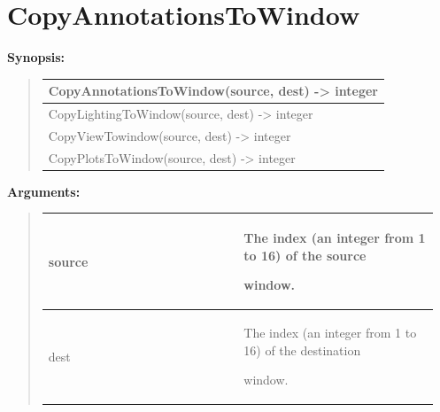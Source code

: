 \documentclass[letterpaper,10pt,english]{sphinxmanual}
\begin{document}
\section{CopyAnnotationsToWindow}
\label{functions:copyannotationstowindow}
\begin{DUlineblock}{0em}
\item[] \textbf{Synopsis:}
\end{DUlineblock}
\begin{quote}

\begin{tabulary}{\linewidth}{|L|}
\hline

CopyAnnotationsToWindow(source, dest) -\textgreater{} integer
\\
\hline
CopyLightingToWindow(source, dest) -\textgreater{} integer
\\
\hline
CopyViewTowindow(source, dest) -\textgreater{} integer
\\
\hline
CopyPlotsToWindow(source, dest) -\textgreater{} integer
\\
\hline\end{tabulary}

\end{quote}

\begin{DUlineblock}{0em}
\item[] 
\item[] \textbf{Arguments:}
\end{DUlineblock}
\begin{quote}

\begin{tabular}{|p{0.475\linewidth}|p{0.475\linewidth}|}
\hline

source
 & 
\begin{DUlineblock}{0em}
\item[] The index (an integer from 1 to 16) of the source
\item[] window.
\end{DUlineblock}
\\
\hline
dest
 & 
\begin{DUlineblock}{0em}
\item[] The index (an integer from 1 to 16) of the destination
\item[] window.
\end{DUlineblock}
\\
\hline\end{tabular}

\end{quote}
\end{document}
